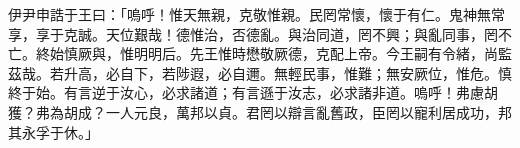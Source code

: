
\begin{pinyinscope}
伊尹申誥于王曰：「嗚呼！惟天無親，克敬惟親。民罔常懷，懷于有仁。鬼神無常享，享于克誠。天位艱哉！德惟治，否德亂。與治同道，罔不興；與亂同事，罔不亡。終始慎厥與，惟明明后。先王惟時懋敬厥德，克配上帝。今王嗣有令緒，尚監茲哉。若升高，必自下，若陟遐，必自邇。無輕民事，惟難；無安厥位，惟危。慎終于始。有言逆于汝心，必求諸道；有言遜于汝志，必求諸非道。嗚呼！弗慮胡獲？弗為胡成？一人元良，萬邦以貞。君罔以辯言亂舊政，臣罔以寵利居成功，邦其永孚于休。」


\end{pinyinscope}